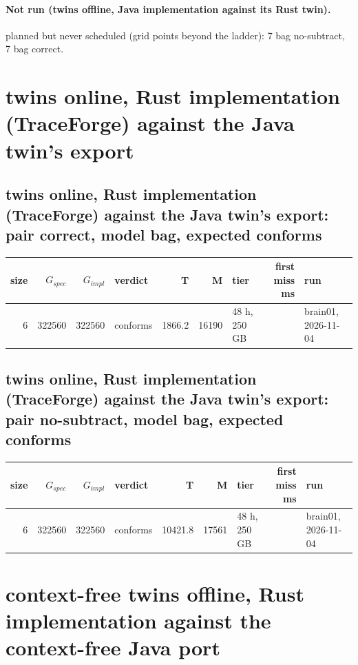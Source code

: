\documentclass[10pt]{article}
\begin{document}
\paragraph{Not run (twins offline, Java implementation against its Rust twin).}
planned but never scheduled (grid points beyond the ladder): 7 bag no-subtract, 7 bag correct.\par
\section*{twins online, Rust implementation (TraceForge) against the Java twin's export}
\subsection*{twins online, Rust implementation (TraceForge) against the Java twin's export: pair \textsf{correct}, model bag, expected conforms}
\begin{longtable}{@{}rrrlrrlrl@{}}
\toprule
size & $G_{\mathit{spec}}$ & $G_{\mathit{impl}}$ & verdict & T & M & tier & first miss ms & run \\
\midrule
\endhead
\color{blue} 6 & 322560 & 322560 & conforms & 1866.2 & 16190 & 48 h, 250 GB &  & brain01, 2026-11-04 \\
\bottomrule
\end{longtable}
\subsection*{twins online, Rust implementation (TraceForge) against the Java twin's export: pair \textsf{no-subtract}, model bag, expected conforms}
\begin{longtable}{@{}rrrlrrlrl@{}}
\toprule
size & $G_{\mathit{spec}}$ & $G_{\mathit{impl}}$ & verdict & T & M & tier & first miss ms & run \\
\midrule
\endhead
\color{blue} 6 & 322560 & 322560 & conforms & 10421.8 & 17561 & 48 h, 250 GB &  & brain01, 2026-11-04 \\
\bottomrule
\end{longtable}
\section*{context-free twins offline, Rust implementation against the context-free Java port}
\end{document}
